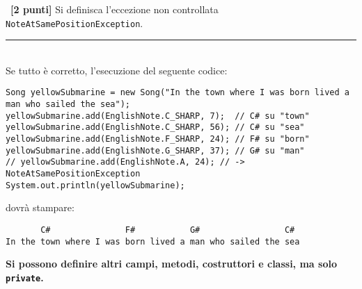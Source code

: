 \documentclass[12pt]{article}
\newcounter{esnu}
\newenvironment{esercizio}{\medskip \noindent {\bf Esercizio\addtocounter{esnu}{1} \arabic{esnu}}}{}
\begin{document}
\begin{esercizio}~\textbf{[2 punti]}
  Si definisca l'eccezione non controllata \texttt{NoteAtSamePositionException}.
\end{esercizio}
%
\mbox{}\\
\hrule
\mbox{}\\

Se tutto \`e  corretto, l'esecuzione del seguente codice:
%
\begin{lstlisting}
Song yellowSubmarine = new Song("In the town where I was born lived a man who sailed the sea");
yellowSubmarine.add(EnglishNote.C_SHARP, 7);  // C# su "town"
yellowSubmarine.add(EnglishNote.C_SHARP, 56); // C# su "sea"
yellowSubmarine.add(EnglishNote.F_SHARP, 24); // F# su "born"
yellowSubmarine.add(EnglishNote.G_SHARP, 37); // G# su "man"
// yellowSubmarine.add(EnglishNote.A, 24); // -> NoteAtSamePositionException
System.out.println(yellowSubmarine);
\end{lstlisting}
%
dovr\`a stampare:
%
\begin{verbatim}
       C#               F#           G#                 C# 
In the town where I was born lived a man who sailed the sea
\end{verbatim}

\begin{center}
\textbf{Si possono definire altri campi, metodi, costruttori e classi, ma solo \texttt{private}.}
\end{center}
\end{document}
